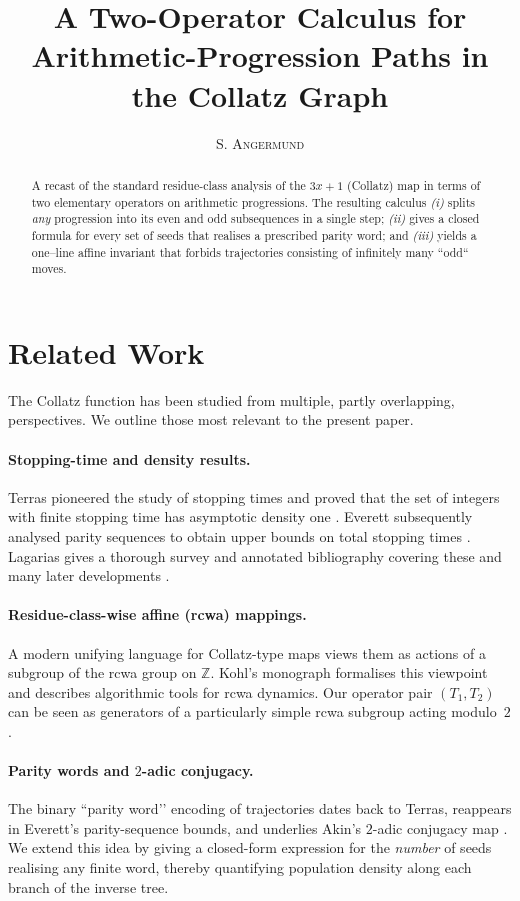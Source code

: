 \documentclass{article}
\title{A Two-Operator Calculus for Arithmetic-Progression Paths in the Collatz Graph}
\author{\textsc{S. Angermund}}
\theoremstyle{definition}
\begin{document}
\maketitle

\begin{abstract}
\noindent
A recast of the standard residue-class analysis of the \(3x+1\) (Collatz) map in
terms of two elementary operators on arithmetic progressions.  The resulting
calculus \emph{(i)} splits \emph{any} progression into its even and odd
subsequences in a single step; \emph{(ii)} gives a closed formula for every set
of seeds that realises a prescribed parity word; and \emph{(iii)} yields a
one–line affine invariant that forbids trajectories consisting of infinitely
many “odd“ moves.
\end{abstract}

\section*{Related Work}\label{sec:related}

The Collatz function has been studied from multiple, partly overlapping,
perspectives.  We outline those most relevant to the present paper.

\paragraph{Stopping-time and density results.}
Terras pioneered the study of stopping times and proved that the set of
integers with finite stopping time has asymptotic density one
\cite{Terras1976}.  Everett subsequently analysed parity sequences to obtain
upper bounds on total stopping times \cite{Everett1977}.  Lagarias gives a
thorough survey and annotated bibliography covering these and many later
developments \cite{LagariasBib2003}.

\paragraph{Residue-class-wise affine (rcwa) mappings.}
A modern unifying language for Collatz-type maps views them as actions of a
subgroup of the rcwa group on \(\mathbb Z\).  Kohl’s monograph
\cite{KohlRCWA2012} formalises this viewpoint and describes algorithmic tools
for rcwa dynamics.  Our operator pair \((T_1,T_2)\) can be seen as generators
of a particularly simple rcwa subgroup acting modulo~\(2\).

\paragraph{Parity words and \(2\)-adic conjugacy.}
The binary “parity word’’ encoding of trajectories dates back to Terras,
reappears in Everett’s parity-sequence bounds, and underlies Akin’s \(2\)-adic
conjugacy map \cite{Akin2004}\cite{LagariasOverview2021}.  We extend
this idea by giving a closed-form expression for the \emph{number} of seeds
realising any finite word, thereby quantifying population density along each
branch of the inverse tree.
\end{document}
